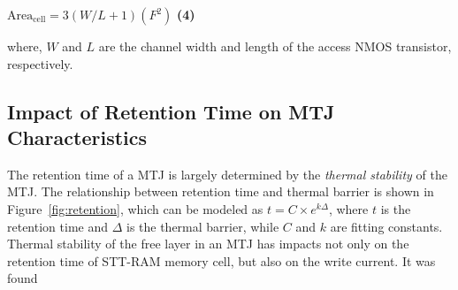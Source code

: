  {
 \small{
 \hspace{55mm} $\mathrm{Area}_{\mathrm{cell}}={3\left(W/L+1\right)}(F^2)$ \hspace{3mm} \textbf{(4)}
 }
 }

where, $W$ and $L$ are the channel width and length of the access NMOS transistor, respectively.

\subsection{Impact of Retention Time on MTJ Characteristics} \label{subsec:retention}



The retention time of a MTJ is largely determined by the \textit{thermal stability} of the MTJ. The relationship
between retention time and thermal barrier is shown in Figure~\ref{fig:retention}, which can be
modeled as $t=C\times e^{k\Delta}$, where $t$ is the retention time and $\Delta$ is the thermal
barrier, while $C$ and $k$ are fitting constants. Thermal stability of the free layer in an MTJ has impacts not
only on the retention time of STT-RAM memory cell, but also on the write current. It was found
